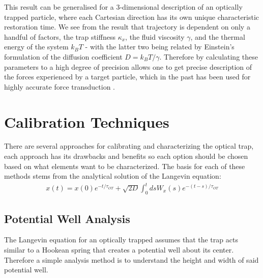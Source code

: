 \documentclass[a4paper,oneside,11pt]{book}
\begin{document}
This result can be generalised for a 3-dimensional description of an optically trapped particle, where each Cartesian direction has its own unique characteristic restoration time. We see from the result that trajectory is dependent on only a handful of factors, the trap stiffness $\kappa_x$, the fluid viscosity $\gamma$, and the thermal energy of the system $k_BT$ - with the latter two being related by Einstein's formulation of the diffusion coefficient $D = k_BT/\gamma$. Therefore by calculating these parameters to a high degree of precision allows one to get precise description of the forces experienced by a target particle, which in the past has been used for highly accurate force transduction \cite{BergSoerensen2004, Smith2003}.

\section{Calibration Techniques}
\label{sec:calibration_techniques}
There are several approaches for calibrating and characterizing the optical trap, each approach has its drawbacks and benefits so each option should be chosen based on what elements want to be characterized. The basis for each of these methods stems from the analytical solution of the Langevin equation:
\begin{align}
	\label{eq:anylitical_lang}
	x(t) = x(0)e^{-t/\tau_{OT}}+\sqrt{2D}\int^t_0dsW_x(s)e^{-(t-s)/\tau_{OT}}
\end{align}

\subsection{Potential Well Analysis}
The Langevin equation for an optically trapped assumes that the trap acts similar to a Hookean spring that creates a potential well about its center. Therefore a simple analysis method is to understand the height and width of said potential well. 
\end{document}
